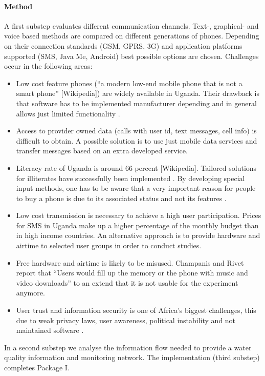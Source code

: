 \documentclass[11pt]{article}
\begin{document}
\paragraph{Method} A first substep evaluates different communication channels. Text-, graphical- and voice based methods are compared on different generations of phones. Depending on their connection standards (GSM, GPRS, 3G) and application platforms supported (SMS, Java Me, Android) best possible options are chosen. Challenges occur in the following areas:
\begin{itemize}
 \item Low cost feature phones (``a modern low-end mobile phone that is not a smart phone'' [Wikipedia]) are widely available in Uganda. Their drawback is that software has to be implemented manufacturer depending and in general allows just limited functionality \citep{champanis2012reporting}.
 \item Access to provider owned data (calls with user id, text messages, cell info) is difficult to obtain. A possible solution is to use just mobile data services and transfer messages based on an extra developed service.
 \item Literacy rate of Uganda is around 66 percent [Wikipedia]. Tailored solutions for illiterates have successfully been implemented \citep{brown2012water}. By developing special input methods, one has to be aware that a very important reason for people to buy a phone is due to its associated status and not its features \citep{knoche2012text}.
 \item Low cost transmission is necessary to achieve a high user participation. Prices for SMS in Uganda make up a higher percentage of the monthly budget than in high income countries. An alternative approach is to provide hardware and airtime to selected user groups in order to conduct studies.
 \item Free hardware and airtime is likely to be misused. Champanis and Rivet report that ``Users would fill up the memory or the phone with music and video downloads'' to an extend that it is not usable for the experiment anymore.
 \item User trust and information security is one of Africa's biggest challenges, this due to weak privacy laws, user awareness, political instability and not maintained software \citep{goodman2010coming}.
\end{itemize}

In a second substep we analyse the information flow needed to provide a water quality information and monitoring network. The implementation (third substep) completes Package I.
\end{document}
